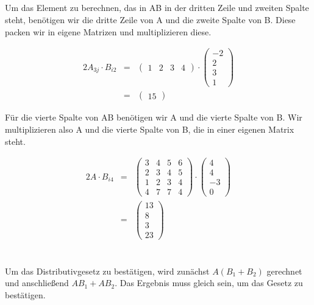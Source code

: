 \documentclass[10pt,a4paper,oneside,ngerman,numbers=noenddot]{scrartcl}
\begin{document}
\subsection{} %
Um das Element zu berechnen, das in AB in der dritten Zeile und zweiten Spalte steht, benötigen wir die dritte Zeile von A und die zweite Spalte von B. Diese packen wir in eigene Matrizen und multiplizieren diese.

\begin{alignat*}{2}
A_{3j} \cdot B_{i2} &=& \begin{pmatrix} 1 & 2 & 3 & 4 \end{pmatrix} \cdot \begin{pmatrix} -2 \\ 2 \\ 3 \\ 1 \end{pmatrix} \\
&=& \begin{pmatrix} 15 \end{pmatrix}
\end{alignat*}

Für die vierte Spalte von AB benötigen wir A und die vierte Spalte von B. Wir multiplizieren also A und die vierte Spalte von B, die in einer eigenen Matrix steht.

\begin{alignat*}{2}
A \cdot B_{i4} &=& \begin{pmatrix} 3 & 4 & 5 & 6 \\ 2 & 3 & 4 & 5 \\ 1 & 2 & 3 & 4 \\ 4 & 7 & 7 & 4 \end{pmatrix} \cdot \begin{pmatrix} 4 \\ 4 \\ -3 \\ 0 \end{pmatrix} \\
&=& \begin{pmatrix} 13 \\ 8 \\ 3 \\ 23 \end{pmatrix}
\end{alignat*}

\section{} %
\subsection{} %
Um das Distributivgesetz zu bestätigen, wird zunächst $A(B_{1} + B_{2})$ gerechnet und anschließend $AB_{1} + AB_{2}$. Das Ergebnis muss gleich sein, um das Gesetz zu bestätigen.
\end{document}
